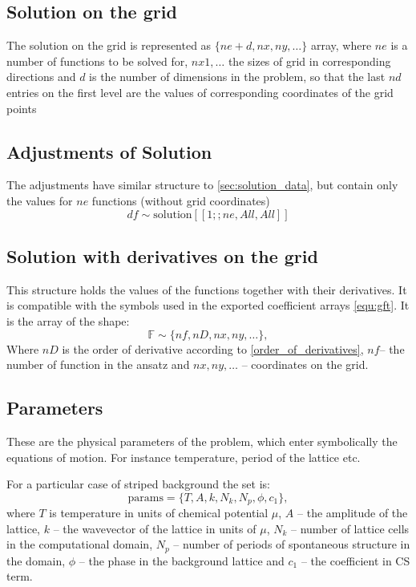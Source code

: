 \documentclass[a4paper,12pt]{article}
\begin{document}
{}
\subsection{\label{sec:solution_data} Solution on the grid}

The solution on the grid is represented as $\{ne+d, nx, ny, \dots \}$ array, where $ne$ is a number of functions to be solved for, $nx1,\dots$ the sizes of grid in corresponding directions and $d$ is the number of dimensions in the problem, so that the last $nd$ entries on the first level are the values of corresponding coordinates of the grid points

\subsection{\label{sec:adjustment_data} Adjustments of Solution}

The adjustments have similar structure to \ref{sec:solution_data}, but contain only the values for $ne$ functions (without grid coordinates) 
\begin{equation}
df \sim \mathrm{solution}[[1;;ne,All,All]]
\end{equation}

\subsection{\label{sec:solution_deriv_data} Solution with derivatives on the grid}

This structure holds the values of the functions together with their derivatives. It is compatible with the symbols used in the exported coefficient arrays \eqref{equ:gft}. It is the array of the shape:
\begin{equation}
\mathbb{F} \sim \{nf, nD, nx, ny, \dots \},
\end{equation}
Where $nD$ is the order of derivative according  to \eqref{order_of_derivatives}, $nf$-- the number of function in the ansatz and $nx,ny, \dots$ -- coordinates on the grid.


\subsection{\label{sec:params} Parameters} 
These are the physical parameters of the problem, which enter symbolically the equations of motion. For instance temperature, period of the lattice etc. 

For a particular case of striped background the set is:
\begin{equation}
\label{equ:params}
\mbox{params} = \{T,A,k,N_k,N_p,\phi,c_1 \},
\end{equation}
where $T$ is temperature in units of chemical potential $\mu$, $A$ -- the amplitude of the lattice, $k$ -- the wavevector of the lattice in units of $\mu$, $N_k$ -- number of lattice cells in the computational domain, $N_p$ -- number of periods of spontaneous structure in the domain, $\phi$ -- the phase in the background lattice and $c_1$ -- the coefficient in CS term.
\end{document}
